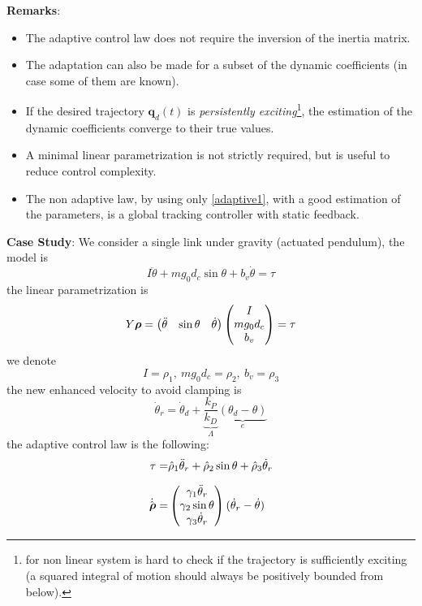 \documentclass[10pt, a4paper]{report}
\newcommand{\q}{{\mathbf q}}
\begin{document}
\noindent\textbf{Remarks}:\begin{itemize}
    \item The adaptive control law does not require the inversion of the inertia matrix.
    \item The adaptation can also be made for a subset of the dynamic coefficients (in case some of them are known). 
    \item If the desired trajectory $\q_d(t)$ is \textit{persistently exciting}\footnote{
        for non linear system is hard to check if the trajectory is sufficiently exciting (a squared integral of motion should always be positively bounded from below).
    }, the estimation of the dynamic coefficients converge to their true values.
    \item A minimal linear parametrization is not strictly required, but is useful to reduce control complexity.
    \item The non adaptive law, by using only \eqref{adaptive1}, with a good estimation of the parameters, is a global tracking controller with static feedback.
\end{itemize}
\noindent\textbf{Case Study}: We consider a single link under gravity (actuated pendulum), the model is\begin{equation}
    I\ddot\theta+mg_0d_c\sin\theta+b_v\dot \theta=\tau 
\end{equation}
the linear parametrization is\begin{equation}
    Y{\boldsymbol{\rho}}=\begin{pmatrix}
        \ddot\theta&\sin\theta&\dot\theta 
    \end{pmatrix}\begin{pmatrix}
        I\\ mg_0d_c\\ b_v 
    \end{pmatrix}=\tau
\end{equation}
we denote \begin{equation}
    I=\rho_1, \ mg_0d_c = \rho_2, \ b_v = \rho_3 
\end{equation}
the new enhanced velocity to avoid clamping is\begin{equation}
    \dot\theta_r=\dot\theta_d+\underbrace{\frac{k_P}{k_D}}_{\Lambda}\underbrace{(\theta_d-\theta)}_{e}
\end{equation}
the adaptive control law is the following:\begin{align}
    \tau=&\hat\rho_1\ddot\theta_r+\hat\rho_2\sin\theta+\hat\rho_3\dot\theta_r\\[1.5ex]
    \dot{\hat{{\boldsymbol{\rho}}}}=&\begin{pmatrix}
        \gamma_1\ddot\theta_r\\ 
        \gamma_2\sin\theta \\ 
        \gamma_3\dot\theta_r
    \end{pmatrix}(\dot\theta_r-\dot\theta)
\end{align}
\end{document}
